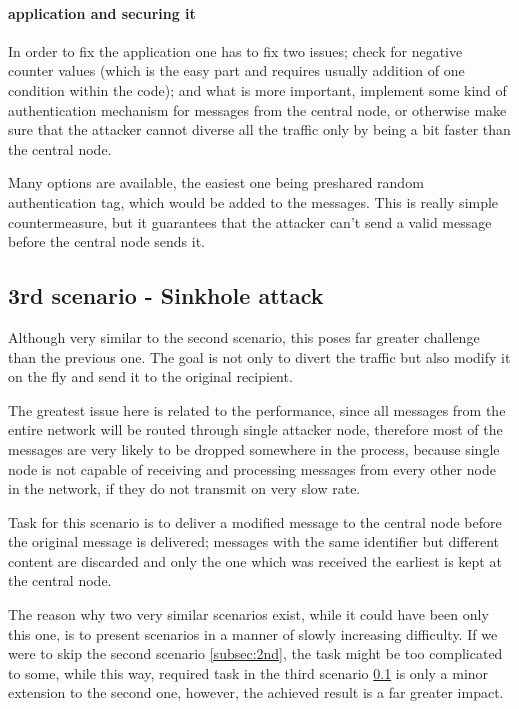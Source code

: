 \documentclass[
  print, %
  Table,   %
  nolof,     %
  nolot,     %
           oneside
]{fithesis3}
\begin{document}
    \paragraph{application and securing it}
    In order to fix the application one has to fix two issues; check for negative counter values (which is the easy part and requires usually addition of one condition within the code); and what is more important, implement some kind of authentication mechanism for messages from the central node, or otherwise make sure that the attacker cannot diverse all the traffic only by being a bit faster than the central node.

    Many options are available, the easiest one being preshared random authentication tag, which would be added to the messages. This is really simple countermeasure, but it guarantees that the attacker can't send a valid message before the central node sends it.

    \subsection{3rd scenario - Sinkhole attack}\label{subsec:3rd}
    Although very similar to the second scenario, this poses far greater challenge than the previous one. The goal is not only to divert the traffic but also modify it on the fly and send it to the original recipient.

    The greatest issue here is related to the performance, since all messages from the entire network will be routed through single attacker node, therefore most of the messages are very likely to be dropped somewhere in the process, because single node is not capable of receiving and processing messages from every other node in the network, if they do not transmit on very slow rate.

    Task for this scenario is to deliver a modified message to the central node before the original message is delivered; messages with the same identifier but different content are discarded and only the one which was received the earliest is kept at the central node.

    The reason why two very similar scenarios exist, while it could have been only this one, is to present scenarios in a manner of slowly increasing difficulty. If we were to skip the second scenario \ref{subsec:2nd}, the task might be too complicated to some, while this way, required task in the third scenario \ref{subsec:3rd} is only a minor extension to the second one, however, the achieved result is a far greater impact.
\end{document}
